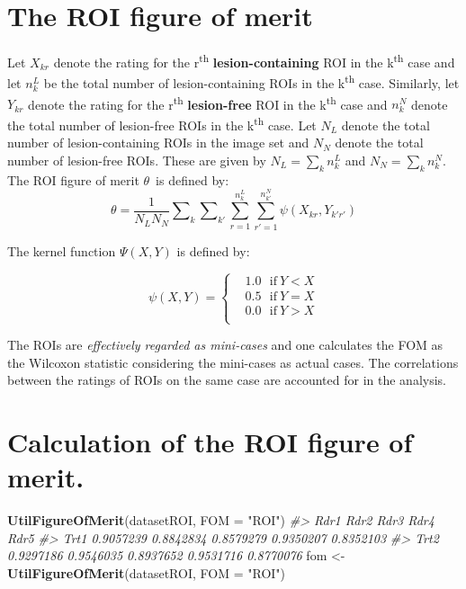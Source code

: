 \documentclass[]{book}
\newenvironment{Shaded}{\begin{snugshade}}{\end{snugshade}}
\newcommand{\CommentTok}[1]{\textcolor[rgb]{0.56,0.35,0.01}{\textit{#1}}}
\newcommand{\DataTypeTok}[1]{\textcolor[rgb]{0.13,0.29,0.53}{#1}}
\newcommand{\KeywordTok}[1]{\textcolor[rgb]{0.13,0.29,0.53}{\textbf{#1}}}
\newcommand{\NormalTok}[1]{#1}
\newcommand{\StringTok}[1]{\textcolor[rgb]{0.31,0.60,0.02}{#1}}
\begin{document}
\hypertarget{the-roi-figure-of-merit}{%
\section{The ROI figure of merit}\label{the-roi-figure-of-merit}}

Let \({{X}_{kr}}\) denote the rating for the r\textsuperscript{th} \textbf{lesion-containing} ROI in the k\textsuperscript{th} case and let \(n_{k}^{L}\) be the total number of lesion-containing ROIs in the k\textsuperscript{th} case. Similarly, let \({{Y}_{kr}}\) denote the rating for the r\textsuperscript{th} \textbf{lesion-free} ROI in the k\textsuperscript{th} case and \(n_{k}^{N}\) denote the total number of lesion-free ROIs in the k\textsuperscript{th} case. Let \({{N}_{L}}\) denote the total number of lesion-containing ROIs in the image set and \({{N}_{N}}\) denote the total number of lesion-free ROIs. These are given by \({{N}_{L}}=\sum\nolimits_{k}{n_{k}^{L}}\) and \({{N}_{N}}=\sum\nolimits_{k}{n_{k}^{N}}\). The ROI figure of merit \(\theta\)~is defined by: \[\theta =\frac{1}{{{N}_{L}}{{N}_{N}}}\sum\nolimits_{k}{\sum\nolimits_{{{k}'}}{\sum\limits_{r=1}^{n_{k}^{L}}{\sum\limits_{{r}'=1}^{n_{k'}^{N}}{\psi ({{X}_{kr}},{{Y}_{{k}'{r}'}})}}}}\]

The kernel function \(\Psi(X,Y)\) is defined by:

\[\psi (X,Y)=\left\{ \begin{aligned}
  & 1.0\ \ \ \text{if}\ Y<X \\ 
 & 0.5\ \ \ \text{if}\ Y=X \\ 
 & 0.0\ \ \ \text{if}\ Y>X \\ 
\end{aligned} \right.\]

The ROIs are \emph{effectively regarded as mini-cases} and one calculates the FOM as the Wilcoxon statistic considering the mini-cases as actual cases. The correlations between the ratings of ROIs on the same case are accounted for in the analysis.

\hypertarget{calculation-of-the-roi-figure-of-merit.}{%
\section{Calculation of the ROI figure of merit.}\label{calculation-of-the-roi-figure-of-merit.}}

\begin{Shaded}
\begin{Highlighting}[]
\KeywordTok{UtilFigureOfMerit}\NormalTok{(datasetROI, }\DataTypeTok{FOM =} \StringTok{"ROI"}\NormalTok{)}
\CommentTok{#>           Rdr1      Rdr2      Rdr3      Rdr4      Rdr5}
\CommentTok{#> Trt1 0.9057239 0.8842834 0.8579279 0.9350207 0.8352103}
\CommentTok{#> Trt2 0.9297186 0.9546035 0.8937652 0.9531716 0.8770076}
\NormalTok{fom <-}\StringTok{ }\KeywordTok{UtilFigureOfMerit}\NormalTok{(datasetROI, }\DataTypeTok{FOM =} \StringTok{"ROI"}\NormalTok{)}
\end{Highlighting}
\end{Shaded}
\end{document}
